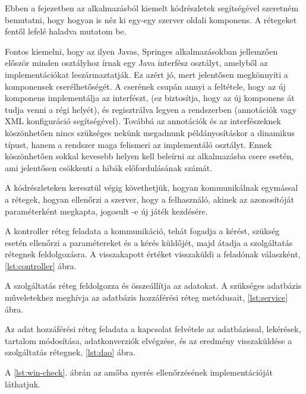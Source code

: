 Ebben a fejezetben az alkalmazásból kiemelt kódrészletek segítségével szeretném bemutatni, hogy hogyan is néz ki egy-egy szerver oldali komponens. A rétegeket fentől lefelé haladva mutatom be.

Fontos kiemelni, hogy az ilyen Javas, Springes alkalmazásokban jellemzően először minden osztályhoz írnak egy Java interfész osztályt, amelyből az implementációkat leszármaztatják. Ez azért jó, mert jelentősen megkönnyíti a komponensek cserélhetőségét. A cserének csupán annyi a feltétele, hogy az új komponens implementálja az interfészt, (ez biztosítja, hogy az új komponens át tudja venni a régi helyét), és regisztrálva legyen a rendszerben (annotációk vagy XML konfiguráció segítségével). Továbbá az annotációk és az interfészeknek köszönhetően nincs szükséges nekünk megadnunk példányosításkor a dinamikus típust, hanem a rendszer maga felismeri az implementáló osztályt. Ennek köszönhetően sokkal kevesebb helyen kell beleírni az alkalmazásba csere esetén, ami jelentősen csökkenti a hibák előfordulásának számát.

A kódrészleteken keresztül végig követhetjük, hogyan kommunikálnak egymással a rétegek, hogyan ellenőrzi a szerver, hogy a felhasználó, akinek az azonosítóját paraméterként megkapta, jogosult -e új játék kezdésére.

A kontroller réteg feladata a kommunikáció, tehát fogadja a kérést, szükség esetén ellenőrzi a paramétereket és a kérés küldőjét, majd átadja a szolgáltatás rétegnek feldolgozásra. A visszakapott értéket visszaküldi a feladónak válaszként, \ref{lst:controller} ábra.


A szolgáltatás réteg feldolgozza és összeállítja az adatokat. A szükséges adatbázis műveletekhez meghívja az adatbázis hozzáférési réteg metódusait, \ref{lst:service} ábra.


Az adat hozzáférési réteg feladata a kapcsolat felvétele az adatbázissal, lekérések, tartalom módosítása, adatkonverziók elvégzése, és az eredmény visszaküldése a szolgáltatás rétegnek,  \ref{lst:dao} ábra.


A \ref{lst:win-check}. ábrán az amőba nyerés ellenőrzésének implementációját láthatjuk.


